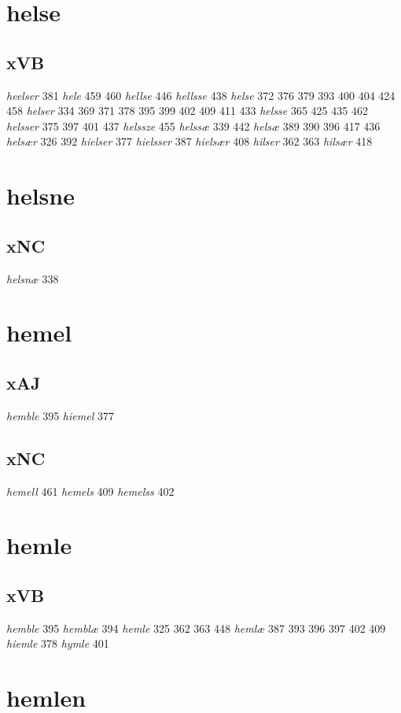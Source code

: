 \documentclass[a4paper,twocolumn]{article}
\begin{document}
\section{helse}
\label{sec:orgdefa000}
\subsection{xVB}
\label{sec:orga7df23f}
\emph{heelser} 381 \emph{hele} 459 460 \emph{hellse} 446 \emph{hellsse} 438 \emph{helse} 372 376 379 393 400 404 424 458 \emph{helser} 334 369 371 378 395 399 402 409 411 433 \emph{helsse} 365 425 435 462 \emph{helsser} 375 397 401 437 \emph{helssze} 455 \emph{helssæ} 339 442 \emph{helsæ} 389 390 396 417 436 \emph{helsær} 326 392 \emph{hielser} 377 \emph{hielsser} 387 \emph{hielsær} 408 \emph{hilser} 362 363 \emph{hilsær} 418 
\section{helsne}
\label{sec:org8e974b9}
\subsection{xNC}
\label{sec:org96e5cfa}
\emph{helsnæ} 338 
\section{hemel}
\label{sec:org1443362}
\subsection{xAJ}
\label{sec:org03ef8a2}
\emph{hemble} 395 \emph{hiemel} 377 
\subsection{xNC}
\label{sec:orgcd39e84}
\emph{hemell} 461 \emph{hemels} 409 \emph{hemelss} 402 
\section{hemle}
\label{sec:orgeae5d77}
\subsection{xVB}
\label{sec:org7e5626b}
\emph{hemble} 395 \emph{hemblæ} 394 \emph{hemle} 325 362 363 448 \emph{hemlæ} 387 393 396 397 402 409 \emph{hiemle} 378 \emph{hymle} 401 
\section{hemlen}
\label{sec:org1232786}
\end{document}
